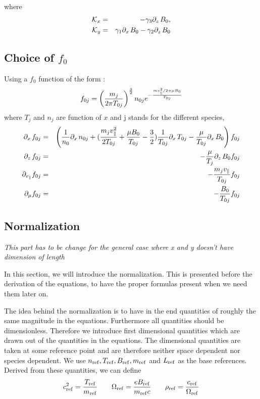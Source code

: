 where 
\begin{eqnarray*}
\mathcal{K}_x &=& - \gamma _3 \partial _{z \,} B_0,  \\
\mathcal{K}_y &=& \gamma_1 \partial _{x \,} B_0 - \gamma_2 \partial _{z \,} B_0
\end{eqnarray*}


\subsection{Choice of $f_0$}
Using a $f_0$ function of the form :
\begin{equation}
f_{0j}=\left ( \frac{m_j}{2\pi T_{0j}} \right )^\frac{3}{2} n_{0j} e^{-\frac{mv_\parallel^2/2+\mu B_0}{T_{0j}}}
\end{equation}
where $T_j$ and $n_j$ are function of $x$ and j stands for the different species,
\begin{eqnarray*}
\partial _{x \,} f_{0j} &=& \left (\frac{1}{n_0}\partial _{x \,} n_{0j} +(\frac{m_j v_\parallel^2}{2 T_{0j}}+\frac{\mu B_0}{T_{0j}}-\frac{3}{2})\frac{1}{T_{0j}}\partial _{x \,} T_{0j}- \frac{\mu}{T_{0j}} \partial _{x \,} B_0 \right ) f_{0j} \\
\partial _{z \,} f_{0j} &=& -\frac{\mu}{T_j}\partial _{z \,} B_0 f_{0j}\\
\partial _{v_\parallel} f_{0j} &=& -\frac{m_j v_\parallel}{T_{0j}} f_{0j} \\
\partial _\mu f_{0j}&=& -\frac{B_0}{T_{0j}} f_{0j}
\end{eqnarray*}

\subsection{Normalization}
\textit{This part has to be change for the general case where x and y doesn't have dimension of length}
\label{sec:normalization}

In this section, we will introduce the normalization. This is
presented before the derivation of the equations, to have the proper
formulas present when we need them later on.

The idea behind the normalization is to have in the end quantities of
roughly the same magnitude in the equations. Furthermore all
quantities should be dimensionless. Therefore we introduce first
dimensional quantities which are drawn out of the quantities in the
equations. The dimensional quantities are taken at some reference
point and are therefore neither space dependent nor species dependent.
We use $n_{\mathrm{ref}}, T_{\mathrm{ref}}, B_{\mathrm{ref}},
m_{\mathrm{ref}}$ and $L_{\mathrm{ref}}$ as the base references. Derived
from these quantities, we can define
\begin{displaymath}
  c_{\mathrm{ref}}^2=\frac{T_{\mathrm{ref}}}{m_{\mathrm{ref}}}
  \qquad \Omega_{\mathrm{ref}}=\frac{eB_{\mathrm{ref}}}{m_{\mathrm{ref}} c}
  \qquad \rho_{\mathrm{ref}}=\frac{c_{\mathrm{ref}}}{\Omega_{\mathrm{ref}}}
\end{displaymath}

